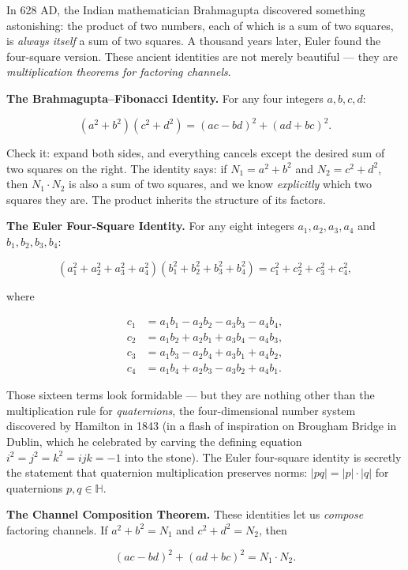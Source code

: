 In 628 AD, the Indian mathematician Brahmagupta discovered something astonishing: the product of two numbers, each of which is a sum of two squares, is \textit{always itself} a sum of two squares. A thousand years later, Euler found the four-square version. These ancient identities are not merely beautiful --- they are \textit{multiplication theorems for factoring channels}.

\textbf{The Brahmagupta--Fibonacci Identity.} For any four integers $a, b, c, d$:

\[
(a^2 + b^2)(c^2 + d^2) = (ac - bd)^2 + (ad + bc)^2.
\]

Check it: expand both sides, and everything cancels except the desired sum of two squares on the right. The identity says: if $N_1 = a^2 + b^2$ and $N_2 = c^2 + d^2$, then $N_1 \cdot N_2$ is also a sum of two squares, and we know \textit{explicitly} which two squares they are. The product inherits the structure of its factors.

\textbf{The Euler Four-Square Identity.} For any eight integers $a_1, a_2, a_3, a_4$ and $b_1, b_2, b_3, b_4$:

\[
(a_1^2 + a_2^2 + a_3^2 + a_4^2)(b_1^2 + b_2^2 + b_3^2 + b_4^2) = c_1^2 + c_2^2 + c_3^2 + c_4^2,
\]

where

\[
\begin{aligned}
c_1 &= a_1 b_1 - a_2 b_2 - a_3 b_3 - a_4 b_4, \\
c_2 &= a_1 b_2 + a_2 b_1 + a_3 b_4 - a_4 b_3, \\
c_3 &= a_1 b_3 - a_2 b_4 + a_3 b_1 + a_4 b_2, \\
c_4 &= a_1 b_4 + a_2 b_3 - a_3 b_2 + a_4 b_1.
\end{aligned}
\]

Those sixteen terms look formidable --- but they are nothing other than the multiplication rule for \textit{quaternions}, the four-dimensional number system discovered by Hamilton in 1843 (in a flash of inspiration on Brougham Bridge in Dublin, which he celebrated by carving the defining equation $i^2 = j^2 = k^2 = ijk = -1$ into the stone). The Euler four-square identity is secretly the statement that quaternion multiplication preserves norms: $|pq| = |p| \cdot |q|$ for quaternions $p, q \in \mathbb{H}$.

\textbf{The Channel Composition Theorem.} These identities let us \textit{compose} factoring channels. If $a^2 + b^2 = N_1$ and $c^2 + d^2 = N_2$, then

\[
(ac - bd)^2 + (ad + bc)^2 = N_1 \cdot N_2.
\]

